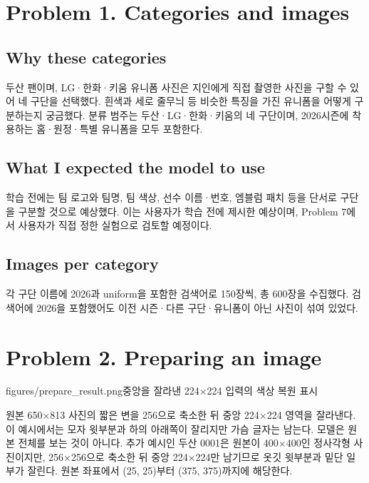 \documentclass[11pt]{article}
\begin{document}
\makeheader

\section*{Problem 1. Categories and images}

\subsection*{Why these categories}
두산 팬이며, LG·한화·키움 유니폼 사진은 지인에게 직접 촬영한 사진을 구할 수 있어 네 구단을 선택했다. 흰색과 세로 줄무늬 등 비슷한 특징을 가진 유니폼을 어떻게 구분하는지 궁금했다. 분류 범주는 두산·LG·한화·키움의 네 구단이며, 2026시즌에 착용하는 홈·원정·특별 유니폼을 모두 포함한다.

\subsection*{What I expected the model to use}
학습 전에는 팀 로고와 팀명, 팀 색상, 선수 이름·번호, 엠블럼 패치 등을 단서로 구단을 구분할 것으로 예상했다. 이는 사용자가 학습 전에 제시한 예상이며, Problem 7에서 사용자가 직접 정한 실험으로 검토할 예정이다.

\subsection*{Images per category}
각 구단 이름에 2026과 uniform을 포함한 검색어로 150장씩, 총 600장을 수집했다. 검색어에 2026을 포함했어도 이전 시즌·다른 구단·유니폼이 아닌 사진이 섞여 있었다.

\section*{Problem 2. Preparing an image}

           {figures/prepare_result.png}{중앙을 잘라낸 224$\times$224 입력의 색상 복원 표시}

원본 650×813 사진의 짧은 변을 256으로 축소한 뒤 중앙 224×224 영역을 잘라낸다. 이 예시에서는 모자 윗부분과 하의 아래쪽이 잘리지만 가슴 글자는 남는다. 모델은 원본 전체를 보는 것이 아니다.
추가 예시인 두산 0001은 원본이 400×400인 정사각형 사진이지만, 256×256으로 축소한 뒤 중앙 224×224만 남기므로 옷깃 윗부분과 밑단 일부가 잘린다. 원본 좌표에서 (25, 25)부터 (375, 375)까지에 해당한다.
\end{document}

